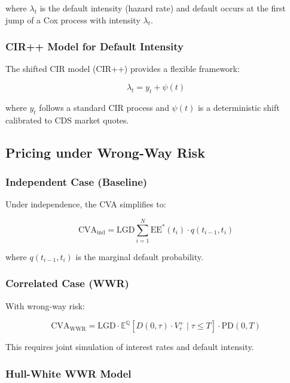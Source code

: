 \documentclass[11pt,a4paper]{article}
\theoremstyle{definition}
\newcommand{\E}{\mathbb{E}}
\newcommand{\Q}{\mathbb{Q}}
\newcommand{\LGD}{\mathrm{LGD}}
\newcommand{\PD}{\mathrm{PD}}
\newcommand{\EE}{\mathrm{EE}}
\newcommand{\CVA}{\mathrm{CVA}}
\begin{document}
where $\lambda_t$ is the default intensity (hazard rate) and default occurs at the first jump of a Cox process with intensity $\lambda_t$.

\subsubsection{CIR++ Model for Default Intensity}

The shifted CIR model (CIR++) provides a flexible framework:

\begin{equation}
\lambda_t = y_t + \psi(t)
\end{equation}

where $y_t$ follows a standard CIR process and $\psi(t)$ is a deterministic shift calibrated to CDS market quotes.

\subsection{Pricing under Wrong-Way Risk}

\subsubsection{Independent Case (Baseline)}

Under independence, the CVA simplifies to:

\begin{equation}
\CVA_{\text{ind}} = \LGD \sum_{i=1}^{N} \EE^*(t_i) \cdot q(t_{i-1}, t_i)
\end{equation}

where $q(t_{i-1}, t_i)$ is the marginal default probability.

\subsubsection{Correlated Case (WWR)}

With wrong-way risk:

\begin{equation}
\CVA_{\text{WWR}} = \LGD \cdot \E^{\Q}\left[ D(0,\tau) \cdot V_\tau^+ \mid \tau \leq T \right] \cdot \PD(0,T)
\end{equation}

This requires joint simulation of interest rates and default intensity.

\subsubsection{Hull-White WWR Model}
\end{document}
